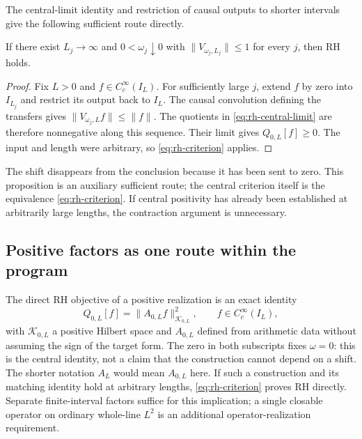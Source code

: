 The central-limit identity and restriction of causal outputs to shorter
intervals give the following sufficient route directly.

\begin{proposition}
\label{prop:rh-diagonal}
If there exist $L_j\to\infty$ and $0<\omega_j\downarrow0$ with
$\lVert V_{\omega_j,L_j}\rVert\leq1$ for every $j$, then RH holds.
\end{proposition}
\begin{proof}
Fix $L>0$ and $f\in C_c^\infty(I_L)$. For sufficiently large $j$,
extend $f$ by zero into $I_{L_j}$ and restrict its output back to $I_L$.
The causal convolution defining the transfers gives
$\lVert V_{\omega_j,L}f\rVert\leq\lVert f\rVert$.
The quotients in \eqref{eq:rh-central-limit} are therefore nonnegative
along this sequence. Their limit gives $Q_{0,L}[f]\geq0$.
The input and length were arbitrary, so \eqref{eq:rh-criterion} applies.
\end{proof}

The shift disappears from the conclusion because it has been sent to
zero. This proposition is an auxiliary sufficient route; the central
criterion itself is the equivalence \eqref{eq:rh-criterion}.
If central positivity has already been established at arbitrarily
large lengths, the contraction argument is unnecessary.

\subsection{Positive factors as one route within the program}
\label{subsec:rh-factor}

The direct RH objective of a positive realization is an exact identity
\begin{equation}
Q_{0,L}[f]=\lVert A_{0,L}f\rVert_{\mathcal K_{0,L}}^2,
\qquad f\in C_c^\infty(I_L),
\label{eq:rh-factor-target}
\end{equation}
with $\mathcal K_{0,L}$ a positive Hilbert space and $A_{0,L}$ defined
from arithmetic data without assuming the sign of the target form.
The zero in both subscripts fixes $\omega=0$: this is the central
identity, not a claim that the construction cannot depend on a shift.
The shorter notation $A_L$ would mean $A_{0,L}$ here.
If such a construction and its matching identity hold at arbitrary
lengths, \eqref{eq:rh-criterion} proves RH directly. Separate
finite-interval factors suffice for this implication; a single
closable operator on ordinary whole-line $L^2$ is an additional
operator-realization requirement.

